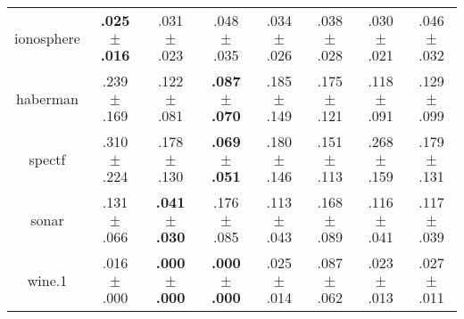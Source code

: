 \begin{tabular}{|c|ccccccc|}
ionosphere & \textbf{.025$^{\phantom{\dag}}\pm^{\phantom{\dag}}$.016}\cellcolor{green!40} & .031$^{\phantom{\dag}}\pm^{\phantom{\dag}}$.023\cellcolor{green!20} & .048$^{\phantom{\dag}}\pm^{\phantom{\dag}}$.035\cellcolor{red!40} & .034$^{\phantom{\dag}}\pm^{\phantom{\dag}}$.026\cellcolor{green!7} & .038$^{\phantom{\dag}}\pm^{\phantom{\dag}}$.028\cellcolor{red!6} & .030$^{\phantom{\dag}}\pm^{\phantom{\dag}}$.021\cellcolor{green!21} & .046$^{\phantom{\dag}}\pm^{\phantom{\dag}}$.032\cellcolor{red!35} \\
haberman & .239$^{\phantom{\dag}}\pm^{\phantom{\dag}}$.169\cellcolor{red!40} & .122$^{\phantom{\dag}}\pm^{\phantom{\dag}}$.081\cellcolor{green!21} & \textbf{.087$^{\phantom{\dag}}\pm^{\phantom{\dag}}$.070}\cellcolor{green!40} & .185$^{\phantom{\dag}}\pm^{\phantom{\dag}}$.149\cellcolor{red!11} & .175$^{\phantom{\dag}}\pm^{\phantom{\dag}}$.121\cellcolor{red!5} & .118$^{\phantom{\dag}}\pm^{\phantom{\dag}}$.091\cellcolor{green!23} & .129$^{\phantom{\dag}}\pm^{\phantom{\dag}}$.099\cellcolor{green!18} \\
spectf & .310$^{\phantom{\dag}}\pm^{\phantom{\dag}}$.224\cellcolor{red!40} & .178$^{\phantom{\dag}}\pm^{\phantom{\dag}}$.130\cellcolor{green!3} & \textbf{.069$^{\phantom{\dag}}\pm^{\phantom{\dag}}$.051}\cellcolor{green!40} & .180$^{\phantom{\dag}}\pm^{\phantom{\dag}}$.146\cellcolor{green!3} & .151$^{\phantom{\dag}}\pm^{\phantom{\dag}}$.113\cellcolor{green!12} & .268$^{\phantom{\dag}}\pm^{\phantom{\dag}}$.159\cellcolor{red!25} & .179$^{\phantom{\dag}}\pm^{\phantom{\dag}}$.131\cellcolor{green!3} \\
sonar & .131$^{\phantom{\dag}}\pm^{\phantom{\dag}}$.066\cellcolor{red!13} & \textbf{.041$^{\phantom{\dag}}\pm^{\phantom{\dag}}$.030}\cellcolor{green!40} & .176$^{\phantom{\dag}}\pm^{\phantom{\dag}}$.085\cellcolor{red!40} & .113$^{\phantom{\dag}}\pm^{\phantom{\dag}}$.043\cellcolor{red!2} & .168$^{\phantom{\dag}}\pm^{\phantom{\dag}}$.089\cellcolor{red!35} & .116$^{\phantom{\dag}}\pm^{\phantom{\dag}}$.041\cellcolor{red!4} & .117$^{\phantom{\dag}}\pm^{\phantom{\dag}}$.039\cellcolor{red!5} \\
wine.1 & .016$^{\phantom{\dag}}\pm^{\phantom{\dag}}$.000\cellcolor{green!25} & \textbf{.000$^{\phantom{\dag}}\pm^{\phantom{\dag}}$.000}\cellcolor{green!40} & \textbf{.000$^{\phantom{\dag}}\pm^{\phantom{\dag}}$.000}\cellcolor{green!40} & .025$^{\phantom{\dag}}\pm^{\phantom{\dag}}$.014\cellcolor{green!16} & .087$^{\phantom{\dag}}\pm^{\phantom{\dag}}$.062\cellcolor{red!40} & .023$^{\phantom{\dag}}\pm^{\phantom{\dag}}$.013\cellcolor{green!19} & .027$^{\phantom{\dag}}\pm^{\phantom{\dag}}$.011\cellcolor{green!15} \\

\end{tabular}

